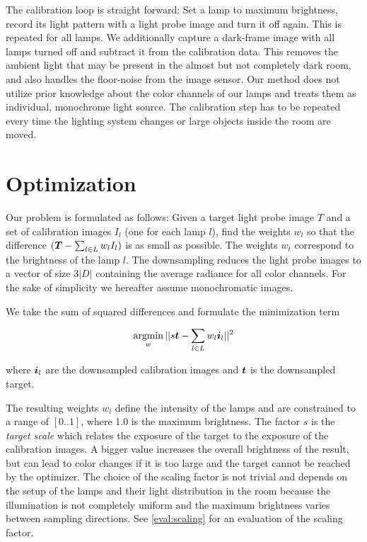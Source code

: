  The calibration loop is straight forward: Set a lamp to maximum brightness, record its light pattern with a light probe image and turn it off again. 
 This is repeated for all lamps.
 We additionally capture a dark-frame image with all lamps turned off and subtract it from the calibration data.
 This removes the ambient light that may be present in the almost but not completely dark room, and also handles the floor-noise from the image sensor.
 Our method does not utilize prior knowledge about the color channels of our lamps and treats them as individual, monochrome light source. 
 The calibration step has to be repeated every time the lighting system changes or large objects inside the room are moved.
  
  
\section{Optimization}
\label{sec:optimization}

  Our problem is formulated as follows: 
  Given a target light probe image $T$ and a set of calibration images $I_l$ (one for each lamp $l$), find the weights $w_l$ so that
  the difference $(\boldsymbol{T} - \sum_{l \in L} w_l I_l)$ is as small as possible. The weights $w_t$ correspond to the brightness of the lamp $l$.
  The downsampling reduces the light probe images to a vector of size $3|D|$ containing the average radiance for all color channels.
  For the sake of simplicity we hereafter assume monochromatic images. 
  
  We take the sum of squared differences and formulate the minimization term
  
  \begin{equation}
    \label{eq:minfunc}
     \operatorname*{argmin}_{w} ||s\boldsymbol{t} - \sum_{l \in L} w_l \boldsymbol{i}_l||^2
  \end{equation}
   
   where $\boldsymbol{i}_l$ are the downsampled calibration images and $\boldsymbol{t}$ is the downsampled target.
   
   The resulting weights $w_l$ define the intensity of the lamps and are constrained to a range of $[0..1]$, where 1.0 is the maximum brightness.   
   The factor $s$ is the \emph{target scale} which relates the exposure of the target to the exposure of the calibration images.
   A bigger value increases the overall brightness of the result, but can lead to color changes if it is too large and the target cannot be reached by the optimizer.
   The choice of the scaling factor is not trivial and depends on the setup of the lamps and their light distribution in the room because the illumination is not completely uniform and the maximum brightness varies between sampling directions.
   See \ref{eval:scaling} for an evaluation of the scaling factor.
   
